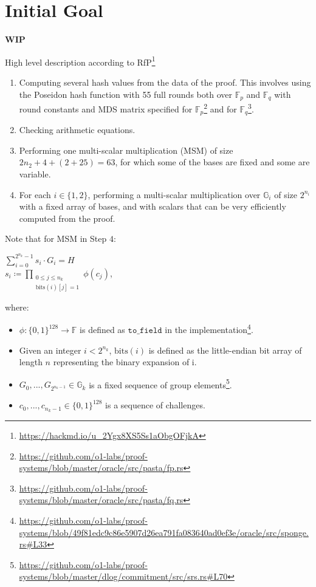 \section{Initial Goal}
\label{section:circuit_introduction}
\textbf{WIP}

High level description according to RfP\footnote{\url{https://hackmd.io/u_2Ygx8XS5Ss1aObgOFjkA}}
\begin{enumerate}
    \item Computing several hash values from the data of the proof.
    This involves using the Poseidon hash function with 55 full rounds both over $\mathbb{F}_p$ and $\mathbb{F}_q$
    with round constants and MDS matrix specified for $\mathbb{F}_p$\footnote{\url{https://github.com/o1-labs/proof-systems/blob/master/oracle/src/pasta/fp.rs}}
    and for $\mathbb{F}_q$\footnote{\url{https://github.com/o1-labs/proof-systems/blob/master/oracle/src/pasta/fq.rs}}.
    \item Checking arithmetic equations.
    \item Performing one multi-scalar multiplication (MSM) of size $2n_2 + 4 + (2 + 25) = 63$,
    for which some of the bases are fixed and some are variable.
    \item For each $i \in \{1, 2\}$, performing a multi-scalar multiplication over $\mathbb{G}_i$ of size $2^{n_i}$
    with a fixed array of bases, and with scalars that can be very efficiently computed from the proof.
\end{enumerate}

Note that for MSM in Step $4$:
\begin{center}
    $\sum\limits_{i = 0}^{2^{n_k} - 1}s_i \cdot G_i = H$ \\
    $s_i \coloneqq \prod\limits_{\substack{0 \leq j \leq n_k \\  \text{bits}(i)[j] = 1}} \phi(c_j)$,
\end{center}
where:
\begin{itemize}
    \item $\phi\colon \{0, 1\}^{128} \to \mathbb{F}$ is defined as $\texttt{to\_field}$ in the implementation\footnote{
        \url{https://github.com/o1-labs/proof-systems/blob/49f81edc9c86e5907d26ea791fa083640ad0ef3e/oracle/src/sponge.rs\#L33}}.
    \item Given an integer $i < 2^{n_k}$, $\text{bits}(i)$ is defined as the little-endian bit array of length $n$ representing the binary expansion of i.
    \item $G_0, ..., G_{2^{n_k - 1}} \in \mathbb{G}_k$ is a fixed sequence of group elements\footnote{
        \url{https://github.com/o1-labs/proof-systems/blob/master/dlog/commitment/src/srs.rs\#L70}}.
    \item $c_0, ..., c_{n_k -1} \in \{0, 1\}^{128}$ is a sequence of challenges.
\end{itemize}
